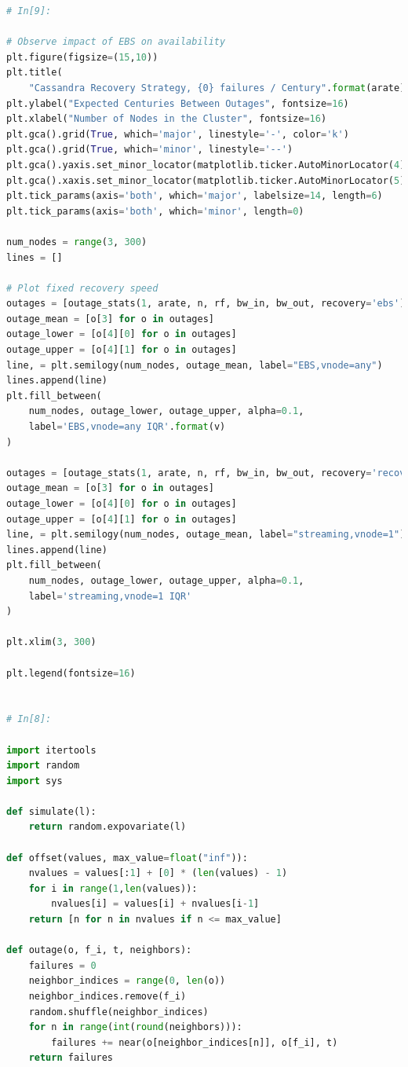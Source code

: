 \documentclass{article}
\begin{document}
\begin{lstlisting}[language=Python]
# In[9]:

# Observe impact of EBS on availability
plt.figure(figsize=(15,10))
plt.title(
    "Cassandra Recovery Strategy, {0} failures / Century".format(arate), fontsize=20)
plt.ylabel("Expected Centuries Between Outages", fontsize=16)
plt.xlabel("Number of Nodes in the Cluster", fontsize=16)
plt.gca().grid(True, which='major', linestyle='-', color='k')
plt.gca().grid(True, which='minor', linestyle='--')
plt.gca().yaxis.set_minor_locator(matplotlib.ticker.AutoMinorLocator(4))
plt.gca().xaxis.set_minor_locator(matplotlib.ticker.AutoMinorLocator(5))
plt.tick_params(axis='both', which='major', labelsize=14, length=6)
plt.tick_params(axis='both', which='minor', length=0)

num_nodes = range(3, 300)
lines = []

# Plot fixed recovery speed
outages = [outage_stats(1, arate, n, rf, bw_in, bw_out, recovery='ebs') for n in num_nodes]
outage_mean = [o[3] for o in outages]
outage_lower = [o[4][0] for o in outages]
outage_upper = [o[4][1] for o in outages]
line, = plt.semilogy(num_nodes, outage_mean, label="EBS,vnode=any")
lines.append(line)
plt.fill_between(
    num_nodes, outage_lower, outage_upper, alpha=0.1,
    label='EBS,vnode=any IQR'.format(v)
)

outages = [outage_stats(1, arate, n, rf, bw_in, bw_out, recovery='recovery') for n in num_nodes]
outage_mean = [o[3] for o in outages]
outage_lower = [o[4][0] for o in outages]
outage_upper = [o[4][1] for o in outages]
line, = plt.semilogy(num_nodes, outage_mean, label="streaming,vnode=1")
lines.append(line)
plt.fill_between(
    num_nodes, outage_lower, outage_upper, alpha=0.1,
    label='streaming,vnode=1 IQR'
)

plt.xlim(3, 300)

plt.legend(fontsize=16)


# In[8]:

import itertools
import random
import sys

def simulate(l):
    return random.expovariate(l)

def offset(values, max_value=float("inf")):
    nvalues = values[:1] + [0] * (len(values) - 1)
    for i in range(1,len(values)):
        nvalues[i] = values[i] + nvalues[i-1]
    return [n for n in nvalues if n <= max_value]

def outage(o, f_i, t, neighbors):
    failures = 0
    neighbor_indices = range(0, len(o))
    neighbor_indices.remove(f_i)
    random.shuffle(neighbor_indices)
    for n in range(int(round(neighbors))):
        failures += near(o[neighbor_indices[n]], o[f_i], t)
    return failures


\end{lstlisting}
\end{document}
